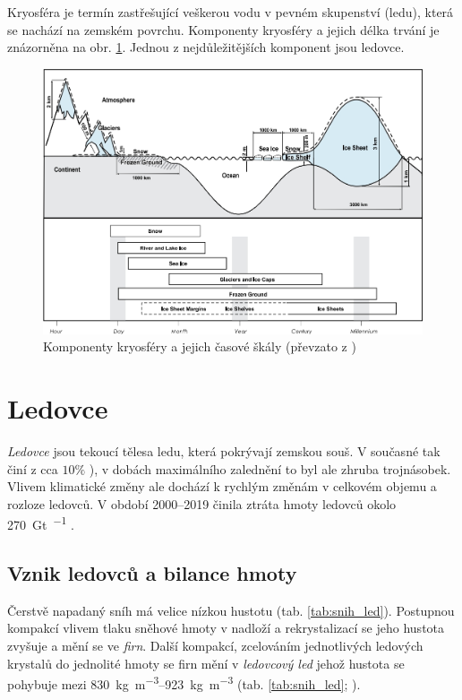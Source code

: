 Kryosféra je termín zastřešující veškerou vodu v pevném skupenství (ledu), která se nachází na zemském povrchu. Komponenty kryosféry a jejich délka trvání je znázorněna na obr. \ref{fig:komponentykryosfery}. Jednou z nejdůležitějších komponent jsou ledovce. 
\begin{figure}
	\centering
	\includegraphics[width=1\linewidth]{obrazky/glac/komponenty_kryosfery}
	\caption{Komponenty kryosféry a jejich časové škály (převzato z \textcite{lemkeObservationsChangesSnow2007})}
	\label{fig:komponentykryosfery}
\end{figure}

\section{Ledovce}
\emph{Ledovce} jsou tekoucí tělesa ledu, která pokrývají zemskou souš. V současné tak činí z cca $10 \%$ \parencite{cuffeyPhysicsGlaciers2010}), v dobách maximálního zalednění to byl ale zhruba trojnásobek. Vlivem klimatické změny ale dochází k rychlým změnám v celkovém objemu a rozloze ledovců. V období 2000--2019 činila ztráta hmoty ledovců okolo \SI{270}{\giga\tonne\per\rok} \parencite{hugonnetAcceleratedGlobalGlacier2021}.

\subsection{Vznik ledovců a bilance hmoty}
Čerstvě napadaný sníh má velice nízkou hustotu (tab. \ref{tab:snih_led}). Postupnou kompakcí vlivem tlaku sněhové hmoty v nadloží a rekrystalizací se jeho hustota zvyšuje a mění se ve \emph{firn}. Další kompakcí, zcelováním jednotlivých ledových krystalů do jednolité hmoty se firn mění v \emph{ledovcový led} jehož hustota se pohybuje mezi \SIrange{830}{923}{\kilogram\per\cubic\metre} (tab. \ref{tab:snih_led}; \textcite{cuffeyPhysicsGlaciers2010}). 

